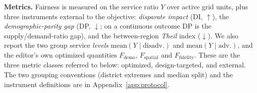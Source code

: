 \textbf{Metrics.} Fairness is measured on the service ratio $Y$ over active
grid units, plus three instruments external to the objective: \emph{disparate
impact} (DI, $\uparrow$), the \emph{demographic-parity gap} (DP, $\downarrow$;
on a continuous outcome DP is the supply/demand-ratio gap), and the
between-region \emph{Theil} index ($\downarrow$). We also report the two group
service \emph{levels} $\mathrm{mean}(Y \mid \mathrm{disadv.})$ and
$\mathrm{mean}(Y \mid \mathrm{adv.})$, and the editor's own optimized
quantities $F_{\mathrm{demo}}$, $F_{\mathrm{spatial}}$ and
$F_{\mathrm{fidelity}}$. These are the three metric classes referred to
below: optimized, design-targeted, and external. The
two grouping conventions (district extremes and median split) and the
instrument definitions are in Appendix~\ref{app:protocol}.

